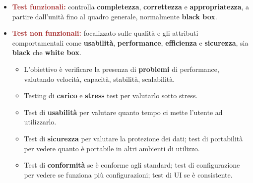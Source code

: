 \begin{itemize}
    \item \textbf{\textcolor{brown}{Test funzionali:}} controlla \textbf{completezza}, \textbf{correttezza} e \textbf{appropriatezza}, a partire dall'unità fino al quadro generale, normalmente \textbf{black box}.
    \item \textbf{\textcolor{brown}{Test non funzionali:}} focalizzato sulle qualità e gli attributi comportamentali come \textbf{usabilità}, \textbf{performance}, \textbf{efficienza} e \textbf{sicurezza}, sia \textbf{black} che \textbf{white box}.
    \begin{itemize}
        \item L'obiettivo è verificare la presenza di \textbf{problemi} di performance, valutando velocità, capacità, stabilità, scalabilità.
        \item Testing di \textbf{carico} e \textbf{stress} test per valutarlo sotto stress.
        \item Test di \textbf{usabilità} per valutare quanto tempo ci mette l'utente ad utilizzarlo.
        \item Test di \textbf{sicurezza} per valutare la protezione dei dati; test di portabilità per vedere quanto è portabile in altri ambienti di utilizzo.
        \item Test di \textbf{conformità} se è conforme agli standard; test di configurazione per vedere se funziona più configurazioni; test di UI se è consistente.
    \end{itemize}
\end{itemize}


